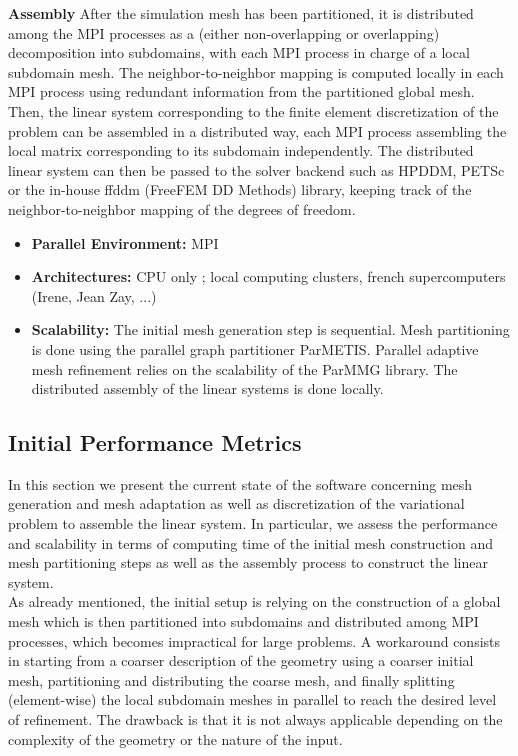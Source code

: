 \textbf{Assembly} After the simulation mesh has been partitioned, it is distributed among the MPI processes as a (either non-overlapping or overlapping) decomposition into subdomains, with each MPI process in charge of a local subdomain mesh. The neighbor-to-neighbor mapping is computed locally in each MPI process using redundant information from the partitioned global mesh. Then, the linear system corresponding to the finite element discretization of the problem can be assembled in a distributed way, each MPI process assembling the local matrix corresponding to its subdomain independently. The distributed linear system can then be passed to the solver backend such as HPDDM, PETSc or the in-house ffddm (FreeFEM DD Methods) library, keeping track of the neighbor-to-neighbor mapping of the degrees of freedom.

\begin{itemize}
    \item \textbf{Parallel Environment:} MPI

    \item \textbf{Architectures:} CPU only ; local computing clusters, french supercomputers (Irene, Jean Zay, ...)
 
    \item \textbf{Scalability:} The initial mesh generation step is sequential. Mesh partitioning is done using the parallel graph partitioner ParMETIS. Parallel adaptive mesh refinement relies on the scalability of the ParMMG library. The distributed assembly of the linear systems is done locally.
\end{itemize}

\subsection{Initial Performance Metrics}
\label{sec:WP1:Freefem++:metrics}

In this section we present the current state of the software concerning mesh generation and mesh adaptation as well as discretization of the variational problem to assemble the linear system. In particular, we assess the performance and scalability in terms of computing time of the initial mesh construction and mesh partitioning steps as well as the assembly process to construct the linear system.\\

As already mentioned, the initial setup is relying on the construction of a global mesh which is then partitioned into subdomains and distributed among MPI processes, which becomes impractical for large problems. A workaround consists in starting from a coarser description of the geometry using a coarser initial mesh, partitioning and distributing the coarse mesh, and ﬁnally splitting (element-wise) the local subdomain meshes in parallel to reach the desired level of reﬁnement. The drawback is that it is not always applicable depending on the complexity of the geometry or the nature of the input.\\

